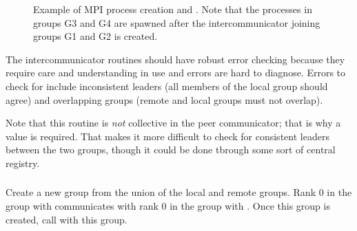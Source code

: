 \documentclass{article}
\begin{document}
\begin{figure}
\centerline{}
\caption{Example of MPI process creation and
.  Note that the processes in groups G3
and G4 are spawned after the intercommunicator joining groups G1 and
G2 is created.}\label{fig:spawn-ic} 
\end{figure}

The intercommunicator routines should have robust error checking because they
require care and understanding in use and errors are hard to diagnose.  
Errors to check for include inconsistent leaders (all members of the local
group should agree) and overlapping groups (remote and local groups
must not overlap).

Note that this routine is \emph{not} collective in the peer
communicator; that is why a  value is required.  That makes
it more difficult to check for consistent leaders between the two
groups, though it could be done tbrough some sort of central registry.
 
\subsubsection{}
Create a new group from the union of the local and remote groups.  Rank 0 in
the group with  communicates with rank 0 in the group with
.  Once this group is created, call
 with this group.  

\end{document}
